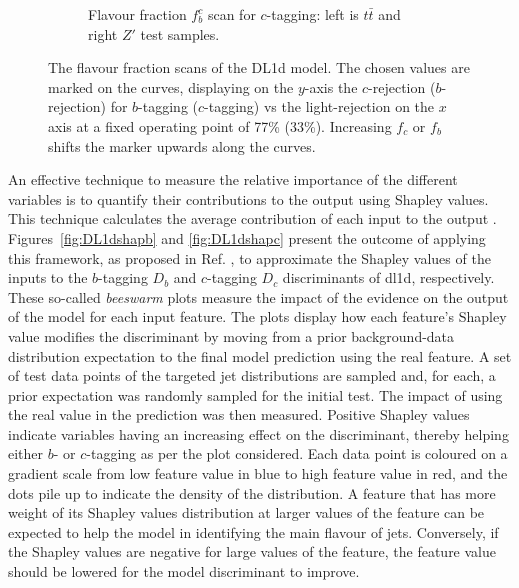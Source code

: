 \begin{figure}[h!]
\begin{subfigure}[b]{\textwidth}
    \caption{Flavour fraction $f_b^c$ scan for $c$-tagging: left is $t\bar{t}$ and right $Z'$ test samples.} 
    \label{fig:DL1dscanfc}
\end{subfigure}
  \caption{The flavour fraction scans of the DL1d model. The chosen values are marked on the curves, displaying on the $y$-axis the $c$-rejection ($b$-rejection) for $b$-tagging ($c$-tagging) vs the light-rejection on the $x$ axis at a fixed operating point of 77\% (33\%). Increasing $f_c$ or $f_b$ shifts the marker upwards along the curves. }
  \label{fig:DL1dscanf}
\end{figure} 

An effective technique to measure the relative importance of the different variables is to quantify their contributions to the output using Shapley values. This technique calculates the average contribution of each input to the output \cite{Rozemberczki2022TheSV}. Figures~\ref{fig:DL1dshapb} and \ref{fig:DL1dshapc} present the outcome of applying this framework, as proposed in Ref. \cite{NIPS2017_7062}, to approximate the Shapley values of the inputs to the $b$-tagging $D_b$ and $c$-tagging $D_c$ discriminants of \gls{dl1d}, respectively. These so-called \textit{beeswarm} plots measure the impact of the evidence on the output of the model for each input feature. The plots display how each feature's Shapley value modifies the discriminant by moving from a prior background-data distribution expectation to the final model prediction using the real feature. A set of test data points of the targeted jet distributions are sampled and, for each, a prior expectation was randomly sampled for the initial test. The impact of using the real value in the prediction was then measured. Positive Shapley values indicate variables having an increasing effect on the discriminant, thereby helping either $b$- or $c$-tagging as per the plot considered. Each data point is coloured on a gradient scale from low feature value in blue to high feature value in red, and the dots pile up to indicate the density of the distribution. A feature that has more weight of its Shapley values distribution at larger values of the feature can be expected to help the model in identifying the main flavour of jets. Conversely, if the Shapley values are negative for large values of the feature, the feature value should be lowered for the model discriminant to improve.

